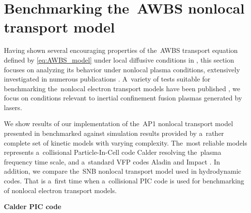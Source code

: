 \section{Benchmarking the~AWBS nonlocal transport model}
\label{sec:BenchmarkingAWBS}
Having shown several encouraging properties of the~AWBS transport 
equation defined by \eqref{eq:AWBS_model} under local diffusive conditions
in , this section focuses on analyzing 
its behavior under nonlocal plasma conditions, extensively investigated 
in numerous publications 
\cite{Malone_1975_15, Colombant_PoP2005, Bell_1981_83, LMV_1983_7, Brantov_Nonlocal_electron_transport_1998, Schurtz_2000, Sorbo_2015}.
A~variety of tests suitable for benchmarking the~nonlocal electron 
transport models have been published 
\cite{Epperlein_PoFB1991, marocchino2013, Sorbo_2015, 
Sorbo_2016, Sherlock_PoP2017, Brodrick_PoP2017}, we focus on 
conditions relevant to inertial confinement fusion plasmas generated by lasers.

We show results of our implementation of the~AP1 nonlocal transport model 
presented in  benchmarked against simulation results 
provided by a~rather complete set of kinetic models with varying complexity. 
The~most reliable models represents a~collisional Particle-In-Cell
code Calder \cite{Lefebvre_NF2003, Perez_PoP2012} resolving 
the~plasma frequency time scale, and a~standard VFP codes
Aladin and Impact \cite{Kingham_JCP2004}.
In addition, we compare the~SNB nonlocal transport model \cite{Schurtz_2000} 
used in hydrodynamic codes. 
That is a~first time when a~collisional PIC code is used
for benchmarking of nonlocal electron transport models. 

\textbf{Calder PIC code}


